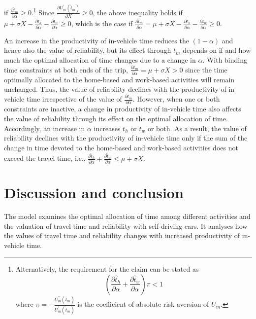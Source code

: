 \documentclass[12pt,a4paper,british]{article}
\makeatletter
\newenvironment{proof}[1][\proofname]{\par
    \normalfont\topsep6\p@\@plus6\p@\relax
    \trivlist
    \itemindent\parindent
    \item[\hskip\labelsep
          \scshape
      #1]\ignorespaces
  }{%
    \endtrivlist\@endpefalse
  }
\providecommand{\proofname}{Proof}
\makeatother
\begin{document}
\begin{proof}
\begin{align*}
\end{align*}
if $\frac{\partial\hat{t}_{m}}{\partial\alpha}\geq0$.\footnote{Alternatively, the requirement for the claim can be stated as%
\begin{equation*}
\left(\frac{\partial\hat{t}_{h}}{\partial\alpha}+\frac{\partial\hat{t}_{w}}{\partial\alpha}\right)\pi<1
\end{equation*}%
where $\pi=-\frac{U_{m}^{\prime\prime}\left(\hat{t}_{m}\right)}{U_{m}^{\prime}\left(\hat{t}_{m}\right)}$ is the coefficient of absolute risk aversion of $U_{m}$.} Since $\frac{\partial U_{m}^{\prime}\left(\hat{t}_{m}\right)}{\partial X}\geq0$, the above inequality holds if $\mu+\sigma X-\frac{\partial\hat{t}_{h}}{\partial\alpha}-\frac{\partial\hat{t}_{w}}{\partial\alpha}\geq0$, which is the case if $\frac{\partial\hat{t}_{m}}{\partial\alpha}=\mu+\sigma X-\frac{\partial\hat{t}_{h}}{\partial\alpha}-\frac{\partial\hat{t}_{w}}{\partial\alpha}\geq0$.
\end{proof}

An increase in the productivity of in-vehicle time reduces the $\left(1-\alpha\right)$ and hence also the value of reliability, but its effect through $t_{m}$ depends on if and how much the optimal allocation of time changes due to a change in $\alpha$. With binding time constraints at both ends of the trip, $\frac{\partial t_{m}}{\partial\alpha}=\mu+\sigma X>0$ since the time optimally allocated to the home-based and work-based activities will remain unchanged. Thus, the value of reliability declines with the productivity of in-vehicle time irrespective of the value of $\frac{\partial t_{m}}{\partial\alpha}$. However, when one or both constraints are inactive, a change in productivity of in-vehicle time also affects the value of reliability through its effect on the optimal allocation of time. Accordingly, an increase in $\alpha$ increases $t_{h}$ or $t_{w}$ or both. As a result, the value of reliability declines with the productivity of in-vehicle time only if the sum of the change in time devoted to the home-based and work-based activities does not exceed the travel time, i.e., $\frac{\partial\hat{t}_{h}}{\partial\alpha}+\frac{\partial\hat{t}_{w}}{\partial\alpha}\leq\mu+\sigma X$.


\section{Discussion and conclusion}

The model examines the optimal allocation of time among different activities and the valuation of travel time and reliability with self-driving cars. It analyses how the values of travel time and reliability changes with increased productivity of in-vehicle time.

\clearpage

% 


\end{document}
